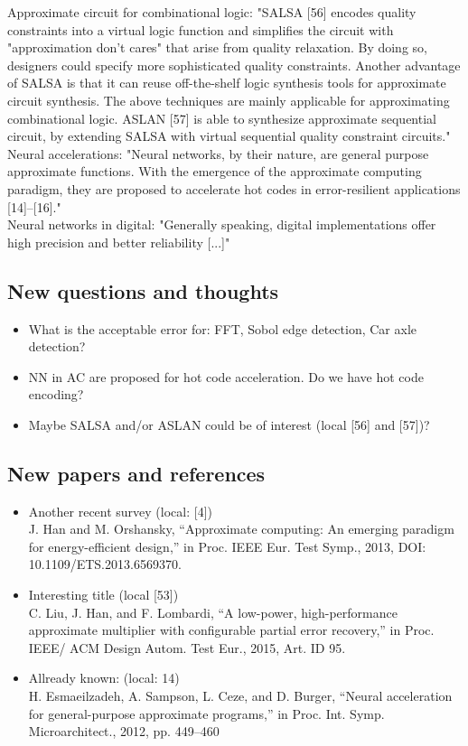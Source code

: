 Approximate circuit for combinational logic: "SALSA [56] encodes quality constraints into a virtual logic function and simplifies the circuit with "approximation don't cares" that arise from quality relaxation. By
doing so, designers could specify more sophisticated quality constraints. Another advantage of SALSA is that it can reuse off-the-shelf logic synthesis tools for approximate circuit synthesis. The above techniques are mainly applicable for approximating combinational logic. ASLAN [57] is able to synthesize approximate sequential circuit, by extending SALSA with virtual sequential quality constraint circuits." \\
Neural accelerations: "Neural networks, by their nature, are general purpose approximate functions. With the emergence of the approximate computing paradigm, they are proposed to accelerate hot codes in error-resilient
applications [14]–[16]."\\
Neural networks in digital: "Generally speaking, digital implementations offer high precision and better reliability [...]"

\subsection*{New questions and thoughts}
\begin{itemize}
	\item What is the acceptable error for: FFT, Sobol edge detection, Car axle detection?
	\item NN in AC are proposed for hot code acceleration. Do we have hot code encoding?
	\item Maybe SALSA and/or ASLAN could be of interest (local [56] and [57])?
\end{itemize}

\subsection*{New papers and references}
\begin{itemize}
	\item Another recent survey (local: [4])\\
	J. Han and M. Orshansky, “Approximate computing: An emerging paradigm for energy-efficient design,” in Proc. IEEE Eur. Test Symp., 2013, DOI: 10.1109/ETS.2013.6569370.
	\item Interesting title (local [53])\\
	C. Liu, J. Han, and F. Lombardi, “A low-power, high-performance approximate multiplier with configurable partial error recovery,” in Proc. IEEE/ ACM Design Autom. Test Eur., 2015, Art. ID 95.
	\item Allready known: (local: 14)\\
	H. Esmaeilzadeh, A. Sampson, L. Ceze, and D. Burger, “Neural acceleration for general-purpose approximate programs,” in Proc. Int. Symp. Microarchitect., 2012, pp. 449–460
		
\end{itemize}